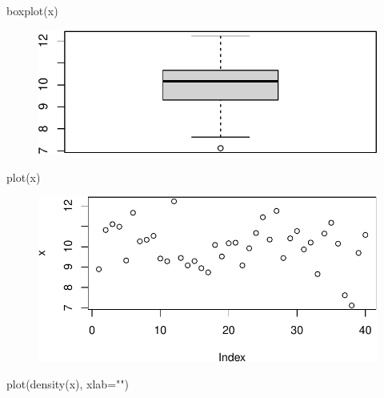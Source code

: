 \documentclass[
  letterpaper,
  DIV=11,
  numbers=noendperiod]{scrreprt}
\newenvironment{Shaded}{\begin{snugshade}}{\end{snugshade}}
\newcommand{\AttributeTok}[1]{\textcolor[rgb]{0.40,0.45,0.13}{#1}}
\newcommand{\FunctionTok}[1]{\textcolor[rgb]{0.28,0.35,0.67}{#1}}
\newcommand{\NormalTok}[1]{\textcolor[rgb]{0.00,0.23,0.31}{#1}}
\newcommand{\StringTok}[1]{\textcolor[rgb]{0.13,0.47,0.30}{#1}}
\begin{document}
\begin{Shaded}
\begin{Highlighting}[]
\FunctionTok{boxplot}\NormalTok{(x)}
\end{Highlighting}
\end{Shaded}

\begin{figure}[H]

{\centering \includegraphics{0-R-tidyverse_files/figure-pdf/unnamed-chunk-18-2.pdf}

}

\end{figure}

\begin{Shaded}
\begin{Highlighting}[]
\FunctionTok{plot}\NormalTok{(x)}
\end{Highlighting}
\end{Shaded}

\begin{figure}[H]

{\centering \includegraphics{0-R-tidyverse_files/figure-pdf/unnamed-chunk-18-3.pdf}

}

\end{figure}

\begin{Shaded}
\begin{Highlighting}[]
\FunctionTok{plot}\NormalTok{(}\FunctionTok{density}\NormalTok{(x), }\AttributeTok{xlab=}\StringTok{""}\NormalTok{)}
\end{Highlighting}
\end{Shaded}
\end{document}
